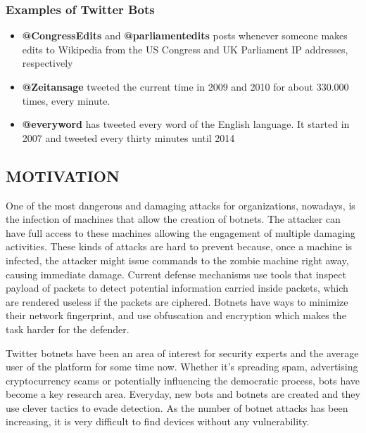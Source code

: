 \documentclass[a4paper, 12pt]{article}
\begin{document}
\subsubsection{Examples of Twitter Bots}
\begin{itemize}
    \item \textbf{@CongressEdits} and \textbf{@parliamentedits} posts whenever someone makes edits to Wikipedia from the US Congress and UK Parliament IP addresses, respectively
    \item \textbf{@Zeitansage} tweeted the current time in 2009 and 2010 for about 330.000 times, every minute.
    \item \textbf{@everyword} has tweeted every word of the English language. It started in 2007 and tweeted every thirty minutes until 2014
\end{itemize}



\newpage
\begin{center}

\section{MOTIVATION}

\end{center}
\par
\hspace{0.5cm}
One of the most dangerous and damaging attacks for organizations, nowadays, is the infection of machines that allow the creation of botnets. The attacker can have full access to these machines allowing the engagement of multiple damaging activities. These kinds of attacks are hard to prevent because, once a machine is infected, the attacker might issue commands to the zombie machine right away, causing immediate damage. Current defense mechanisms use tools that inspect payload of packets to detect potential information carried inside packets, which are rendered useless if the packets are ciphered. Botnets have ways to minimize their network fingerprint, and use obfuscation and encryption which makes the task harder for the defender.
\par
\hspace{0.5cm}
Twitter botnets have been an area of interest for security experts and the average user of the platform for some time now. Whether it’s spreading spam, advertising cryptocurrency scams or potentially influencing the democratic process, bots have become a key research area. Everyday, new bots and botnets are created and they use clever tactics to evade detection. As the number of botnet attacks has been increasing, it is very difficult to find devices without any vulnerability. 
\end{document}
